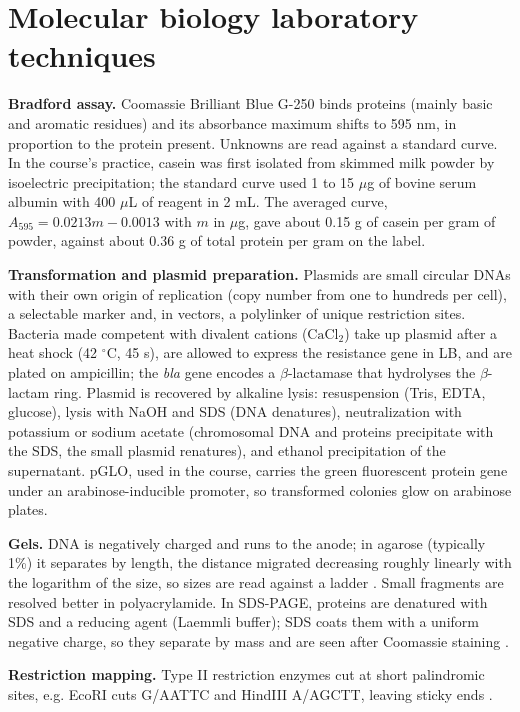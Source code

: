 \section{Molecular biology laboratory
techniques}
\label{section-mcb-lab-techniques}

\textbf{Bradford assay.}
Coomassie Brilliant Blue G-250 binds proteins
(mainly basic and aromatic residues) and its
absorbance maximum shifts to 595 nm, in
proportion to the protein present. Unknowns
are read against a standard curve. In the
course's practice, casein was first isolated
from skimmed milk powder by isoelectric
precipitation; the standard curve used 1 to
15 $\mu$g of bovine serum albumin with 400
$\mu$L of reagent in 2 mL. The averaged
curve, $A_{595} = 0.0213 m - 0.0013$ with $m$
in $\mu$g, gave about 0.15 g of casein per
gram of powder, against about 0.36 g of total
protein per gram on the label.

\textbf{Transformation and plasmid
preparation.}
Plasmids are small circular DNAs with their
own origin of replication (copy number from
one to hundreds per cell), a selectable
marker and, in vectors, a polylinker of
unique restriction sites. Bacteria made
competent with divalent cations
($\mathrm{CaCl_2}$) take up plasmid after a
heat shock (42 $^\circ$C, 45 s), are allowed
to express the resistance gene in LB, and are
plated on ampicillin; the \emph{bla} gene
encodes a $\beta$-lactamase that hydrolyses
the $\beta$-lactam ring. Plasmid is recovered
by alkaline lysis: resuspension (Tris, EDTA,
glucose), lysis with NaOH and SDS (DNA
denatures), neutralization with potassium or
sodium acetate (chromosomal DNA and proteins
precipitate with the SDS, the small plasmid
renatures), and ethanol precipitation of the
supernatant. pGLO, used in the course,
carries the green fluorescent protein gene
under an arabinose-inducible promoter, so
transformed colonies glow on arabinose
plates.

\textbf{Gels.}
DNA is negatively charged and runs to the
anode; in agarose (typically 1\%) it
separates by length, the distance migrated
decreasing roughly linearly with the
logarithm of the size, so sizes are read
against a ladder \cite[Chapter
10]{alberts2014essential}. Small fragments
are resolved better in polyacrylamide. In
SDS-PAGE, proteins are denatured with SDS and
a reducing agent (Laemmli buffer); SDS coats
them with a uniform negative charge, so they
separate by mass and are seen after Coomassie
staining \cite[Section
5-2]{voet2013fundamentals}.

\textbf{Restriction mapping.}
Type II restriction enzymes cut at short
palindromic sites, e.g. EcoRI cuts G/AATTC
and HindIII A/AGCTT, leaving sticky ends
\cite[Section 3-4]{voet2013fundamentals}.

